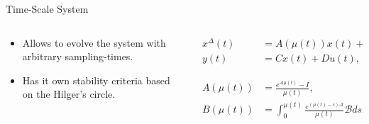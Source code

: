 \begin{slide}{Time-Scale System}
  \begin{columns}[c]
    \begin{column}{0.48\textwidth}
      \begin{itemize}
        \item Allows to evolve the system with arbitrary sampling-times.
        \item Has it own stability criteria based on the Hilger's circle.
      \end{itemize}
    \end{column}%
    \hfill%
    \begin{column}{0.48\textwidth}
      \begin{align}
        x^{\Delta}(t) & = A(\mu(t))x(t) + B(\mu(t))u(t),                                          \\
        y(t)          & = Cx(t) + Du(t),                                                          \\
        \phantom{1}   & \phantom{1}                                 \nonumber                     \\
        A(\mu(t))     & = \frac{e^{\mathcal{A}\mu(t)}-I}{\mu(t)},                                 \\
        B(\mu(t))     & = \int_{0}^{\mu(t)}\frac{e^{(\mu(t)-s)\mathcal{A}}}{\mu(t)}\mathcal{B}ds.
      \end{align}
    \end{column}%
  \end{columns}
\end{slide}

